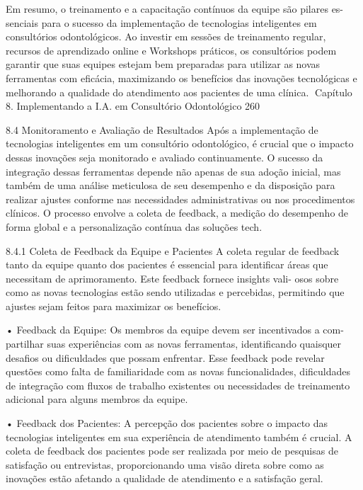        Em resumo, o treinamento e a capacitação contínuos da equipe são pilares es-
senciais para o sucesso da implementação de tecnologias inteligentes em consultórios
odontológicos. Ao investir em sessões de treinamento regular, recursos de aprendizado
online e Workshops práticos, os consultórios podem garantir que suas equipes estejam
bem preparadas para utilizar as novas ferramentas com eficácia, maximizando os
benefícios das inovações tecnológicas e melhorando a qualidade do atendimento aos
pacientes de uma clínica.
Capítulo 8. Implementando a I.A. em Consultório Odontológico                       260


8.4     Monitoramento e Avaliação de Resultados
Após a implementação de tecnologias inteligentes em um consultório odontológico, é
crucial que o impacto dessas inovações seja monitorado e avaliado continuamente.
O sucesso da integração dessas ferramentas depende não apenas de sua adoção
inicial, mas também de uma análise meticulosa de seu desempenho e da disposição
para realizar ajustes conforme nas necessidades administrativas ou nos procedimentos
clínicos. O processo envolve a coleta de feedback, a medição do desempenho de forma
global e a personalização contínua das soluções tech.

8.4.1    Coleta de Feedback da Equipe e Pacientes
A coleta regular de feedback tanto da equipe quanto dos pacientes é essencial para
identificar áreas que necessitam de aprimoramento. Este feedback fornece insights vali-
osos sobre como as novas tecnologias estão sendo utilizadas e percebidas, permitindo
que ajustes sejam feitos para maximizar os benefícios.

    • Feedback da Equipe: Os membros da equipe devem ser incentivados a com-
      partilhar suas experiências com as novas ferramentas, identificando quaisquer
      desafios ou dificuldades que possam enfrentar. Esse feedback pode revelar
      questões como falta de familiaridade com as novas funcionalidades, dificuldades
      de integração com fluxos de trabalho existentes ou necessidades de treinamento
      adicional para alguns membros da equipe.

    • Feedback dos Pacientes: A percepção dos pacientes sobre o impacto das
      tecnologias inteligentes em sua experiência de atendimento também é crucial.
      A coleta de feedback dos pacientes pode ser realizada por meio de pesquisas
      de satisfação ou entrevistas, proporcionando uma visão direta sobre como as
      inovações estão afetando a qualidade de atendimento e a satisfação geral.

